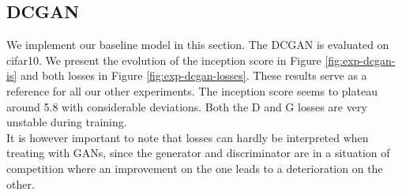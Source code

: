 \subsection{DCGAN}
\label{sec:exp-dcgan}

We implement our baseline model in this section. The DCGAN is evaluated on cifar10. We present the evolution of the inception score in Figure \ref{fig:exp-dcgan-is} and both losses in Figure \ref{fig:exp-dcgan-losses}. These results serve as a reference for all our other experiments. The inception score seems to plateau around 5.8 with considerable deviations. Both the D and G losses are very unstable during training. \\
It is however important to note that losses can hardly be interpreted when treating with GANs, since the generator and discriminator are in a situation of competition where an improvement on the one leads to a deterioration on the other.
